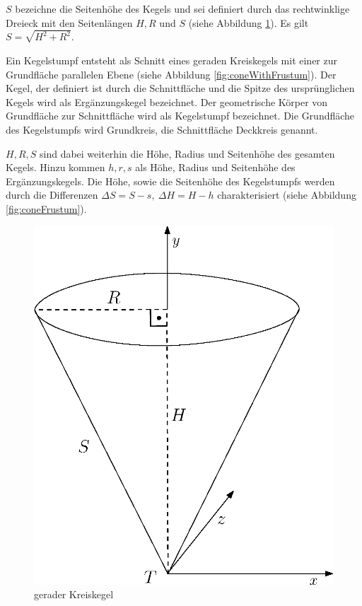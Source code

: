 $S$ bezeichne die Seitenhöhe des Kegels und sei definiert durch das rechtwinklige Dreieck mit den Seitenlängen $H,R$ und $S$ (siehe Abbildung \ref{fig:cone}). Es gilt $S = \sqrt{H^2 + R^2}$.
\bigskip
\begin{definition}
	Ein Kegelstumpf entsteht als Schnitt eines geraden Kreiskegels mit einer zur Grundfläche parallelen Ebene (siehe Abbildung \ref{fig:coneWithFrustum}). Der Kegel, der definiert ist durch die Schnittfläche und die Spitze des ursprünglichen Kegels wird als Ergänzungskegel bezeichnet. Der geometrische Körper von Grundfläche zur Schnittfläche wird als Kegelstumpf bezeichnet. Die Grundfläche des Kegelstumpfs wird Grundkreis, die Schnittfläche Deckkreis genannt.

	$H, R, S$ sind dabei weiterhin die Höhe, Radius und Seitenhöhe des gesamten Kegels. Hinzu kommen $h,r,s$ als Höhe, Radius und Seitenhöhe des Ergänzungskegels. Die Höhe, sowie die Seitenhöhe des Kegelstumpfs werden durch die Differenzen $\Delta S = S - s,~ \Delta H = H-h$ charakterisiert (siehe Abbildung \ref{fig:coneFrustum}).
\end{definition}

\begin{figure}[!htb]
	\centering
	\includegraphics[scale=.5]{images/fullCone.eps}
	\caption{gerader Kreiskegel}
	\label{fig:cone}
\end{figure}

